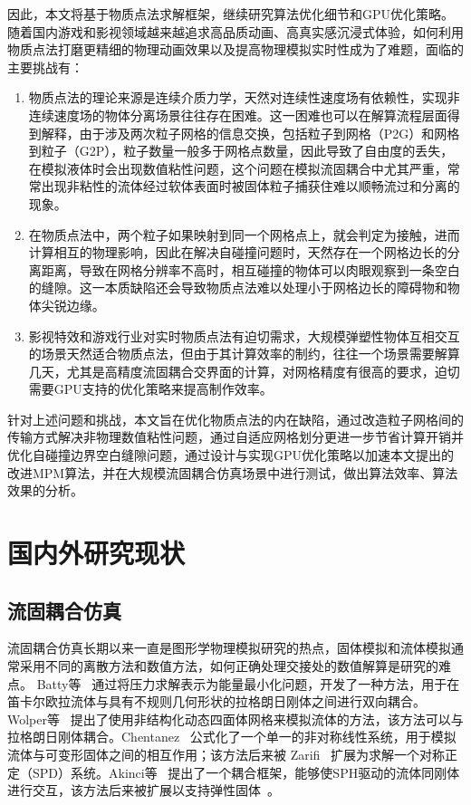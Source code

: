 因此，本文将基于物质点法求解框架，继续研究算法优化细节和GPU优化策略。随着国内游戏和影视领域越来越追求高品质动画、高真实感沉浸式体验，如何利用物质点法打磨更精细的物理动画效果以及提高物理模拟实时性成为了难题，面临的主要挑战有：

\begin{enumerate}
    \item[1.] 物质点法的理论来源是连续介质力学，天然对连续性速度场有依赖性，实现非连续速度场的物体分离场景往往存在困难。这一困难也可以在解算流程层面得到解释，由于涉及两次粒子网格的信息交换，包括粒子到网格（P2G）和网格到粒子（G2P），粒子数量一般多于网格点数量，因此导致了自由度的丢失，在模拟液体时会出现数值粘性问题，这个问题在模拟流固耦合中尤其严重，常常出现非粘性的流体经过软体表面时被固体粒子捕获住难以顺畅流过和分离的现象。
    \item[2.] 在物质点法中，两个粒子如果映射到同一个网格点上，就会判定为接触，进而计算相互的物理影响，因此在解决自碰撞问题时，天然存在一个网格边长的分离距离，导致在网格分辨率不高时，相互碰撞的物体可以肉眼观察到一条空白的缝隙。这一本质缺陷还会导致物质点法难以处理小于网格边长的障碍物和物体尖锐边缘。
    \item[3.] 影视特效和游戏行业对实时物质点法有迫切需求，大规模弹塑性物体互相交互的场景天然适合物质点法，但由于其计算效率的制约，往往一个场景需要解算几天，尤其是高精度流固耦合交界面的计算，对网格精度有很高的要求，迫切需要GPU支持的优化策略来提高制作效率。
\end{enumerate}


针对上述问题和挑战，本文旨在优化物质点法的内在缺陷，通过改造粒子网格间的传输方式解决非物理数值粘性问题，通过自适应网格划分更进一步节省计算开销并优化自碰撞边界空白缝隙问题，通过设计与实现GPU优化策略以加速本文提出的改进MPM算法，并在大规模流固耦合仿真场景中进行测试，做出算法效率、算法效果的分析。

\section{国内外研究现状}
\subsection{流固耦合仿真}
流固耦合仿真长期以来一直是图形学物理模拟研究的热点，固体模拟和流体模拟通常采用不同的离散方法和数值方法，如何正确处理交接处的数值解算是研究的难点。
Batty等~\cite{batty2007fast} 通过将压力求解表示为能量最小化问题，开发了一种方法，用于在笛卡尔欧拉流体与具有不规则几何形状的拉格朗日刚体之间进行双向耦合。Wolper等~\cite{klingner2006fluid} 提出了使用非结构化动态四面体网格来模拟流体的方法，该方法可以与拉格朗日刚体耦合。Chentanez~\cite{chentanez2006simultaneous} 公式化了一个单一的非对称线性系统，用于模拟流体与可变形固体之间的相互作用；该方法后来被 Zarifi~\cite{zarifi2017positive} 扩展为求解一个对称正定（SPD）系统。Akinci等~\cite{akinci2012versatile} 提出了一个耦合框架，能够使SPH驱动的流体同刚体进行交互，该方法后来被扩展以支持弹性固体~\cite{akinci2013coupling}。

